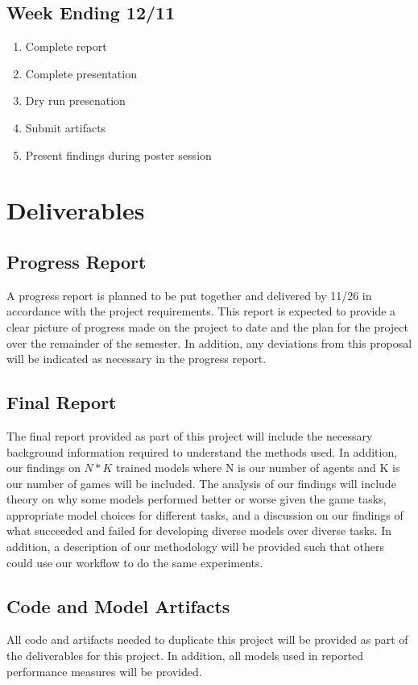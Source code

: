 \documentclass[conference]{IEEEtran}
\begin{document}
\subsection{Week Ending 12/11}
\begin{enumerate}
    \item Complete report
    \item Complete presentation
    \item Dry run presenation
    \item Submit artifacts
    \item Present findings during poster session
\end{enumerate}

\section{Deliverables}

\subsection{Progress Report}
A progress report is planned to be put together and delivered by 11/26 in accordance with the project requirements.
This report is expected to provide a clear picture of progress made on the project to date and the plan for the project over the remainder of the semester.
In addition, any deviations from this proposal will be indicated as necessary in the progress report.

\subsection{Final Report}
The final report provided as part of this project will include the necessary background information required to understand the methods used.
In addition, our findings on $N*K$ trained models where N is our number of agents and K is our number of games will be included.
The analysis of our findings will include theory on why some models performed better or worse given the game tasks, appropriate model choices for different tasks, and a discussion on our findings of what succeeded and failed for developing diverse models over diverse tasks.
In addition, a description of our methodology will be provided such that others could use our workflow to do the same experiments.

\subsection{Code and Model Artifacts}
All code and artifacts needed to duplicate this project will be provided as part of the deliverables for this project.
In addition, all models used in reported performance measures will be provided.
\end{document}
